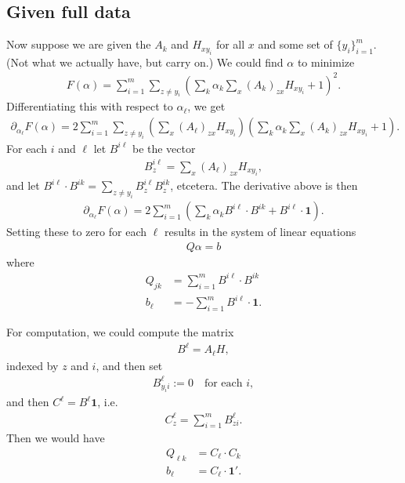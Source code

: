 \documentclass{article}
\newcommand{\bone}{\mathbf{1}}
\begin{document}
\subsection*{Given full data}

Now suppose we are given the $A_k$ and $H_{xy_i}$ for all $x$ and some set of $\{y_i\}_{i=1}^m$.
(Not what we actually have, but carry on.)
We could find $\alpha$ to minimize
\begin{align}
  F(\alpha) = \sum_{i=1}^m \sum_{z \neq y_i} \left( \sum_k \alpha_k \sum_x (A_k)_{zx} H_{xy_i} + 1 \right)^2 .
\end{align}
Differentiating this with respect to $\alpha_\ell$,
we get
\begin{align}
  \partial_{\alpha_\ell} F(\alpha) = 2 \sum_{i=1}^m \sum_{z \neq y_i} \left( \sum_x (A_\ell)_{zx} H_{xy_i} \right) \left( \sum_k \alpha_k \sum_x (A_k)_{zx} H_{xy_i} + 1 \right) .
\end{align}
For each $i$ and $\ell$ let $B^{i\ell}$ be the vector
\begin{align}
  B^{i\ell}_z = \sum_x (A_\ell)_{zx} H_{xy_i} ,
\end{align}
and let $B^{i\ell} \cdot B^{ik} = \sum_{z \neq y_i} B^{i\ell}_z B^{ik}_z$, etcetera.
The derivative above is then
\begin{align}
  \partial_{\alpha_\ell} F(\alpha) = 2 \sum_{i=1}^m \left( \sum_k \alpha_k B^{i\ell} \cdot B^{ik} + B^{i\ell} \cdot \bone \right) .
\end{align}
Setting these to zero for each $\ell$ results in the system of linear equations
\begin{align}
  Q \alpha = b
\end{align}
where
\begin{align}
    Q_{jk} &= \sum_{i=1}^m  B^{i\ell} \cdot B^{ik} \\
    b_\ell  &= - \sum_{i=1}^m  B^{i\ell } \cdot \bone .
\end{align}

For computation, we could compute the matrix
\begin{align}
  B^\ell  = A_\ell  H ,
\end{align}
indexed by $z$ and $i$,
and then set
\begin{align}
  B^\ell _{y_i i} := 0 \quad \text{for each } i ,
\end{align}
and then $C^\ell  = B^\ell  \bone$, i.e.
\begin{align}
  C^\ell _z = \sum_{i=1}^m B^\ell_{z i} .
\end{align}
Then we would have
\begin{align}
    Q_{\ell k} &= C_\ell \cdot C_k \\
    b_\ell &= C_\ell \cdot \bone' .
\end{align}
\end{document}
